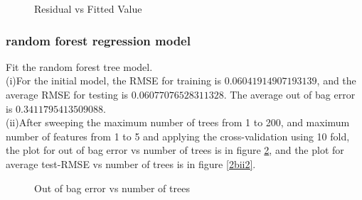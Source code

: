 \documentclass{article}
\begin{document}
\begin{figure}[!htbp]
\centering
{}
\caption{Residual vs Fitted Value} \label{2aii}
\end{figure}

\subsubsection{random forest regression model}

Fit the random forest tree model.\\

(i)For the initial model, the RMSE for training is $0.06041914907193139$, and the average RMSE for testing is $0.06077076528311328$. The average out of bag error is $0.3411795413509088$.\\

(ii)After sweeping the maximum number of trees from 1 to 200, and maximum number of features from 1 to 5 and applying the cross-validation using 10 fold, the plot for out of bag error vs number of trees is in figure \ref{2bii1}, and the plot for average test-RMSE vs number of trees is in figure \ref{2bii2}.\\

\begin{figure}[!htbp]
\centering
{}
\caption{Out of bag error vs number of trees} \label{2bii1}
\end{figure}
\end{document}
